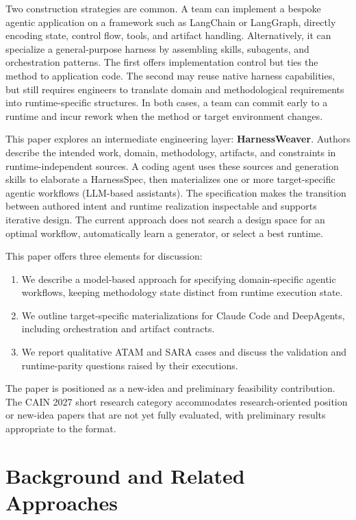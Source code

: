 \documentclass[10pt,conference]{IEEEtran}
\begin{document}
Two construction strategies are common. A team can implement a bespoke agentic application on a framework such as LangChain or LangGraph, directly encoding state, control flow, tools, and artifact handling. Alternatively, it can specialize a general-purpose harness by assembling skills, subagents, and orchestration patterns. The first offers implementation control but ties the method to application code. The second may reuse native harness capabilities, but still requires engineers to translate domain and methodological requirements into runtime-specific structures. In both cases, a team can commit early to a runtime and incur rework when the method or target environment changes.

This paper explores an intermediate engineering layer: \textbf{HarnessWeaver}. Authors describe the intended work, domain, methodology, artifacts, and constraints in runtime-independent sources. A coding agent uses these sources and generation skills to elaborate a HarnessSpec, then materializes one or more target-specific agentic workflows (LLM-based assistants). The specification makes the transition between authored intent and runtime realization inspectable and supports iterative design. The current approach does not search a design space for an optimal workflow, automatically learn a generator, or select a best runtime.

This paper offers three elements for discussion:

\begin{enumerate}
\def\labelenumi{\arabic{enumi}.}

\item
  We describe a model-based approach for specifying domain-specific agentic workflows, keeping methodology state distinct from runtime execution state.
\item
  We outline target-specific materializations for Claude Code and DeepAgents, including orchestration and artifact contracts.
\item
  We report qualitative ATAM and SARA cases and discuss the validation and runtime-parity questions raised by their executions.
\end{enumerate}

The paper is positioned as a new-idea and preliminary feasibility contribution. The CAIN 2027 short research category accommodates research-oriented position or new-idea papers that are not yet fully evaluated, with preliminary results appropriate to the format.

\section{Background and Related Approaches}
\end{document}
